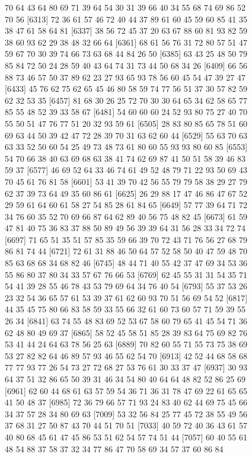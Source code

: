 \documentclass{article}
\begin{document}
\begin{figure}[H]
\begin{Schunk}
\begin{Soutput}
 [6289] 70 64 43 64 80 69 71 39 64 54 30 31 39 66 40 34 55 68 74 69 86 52 70 56
 [6313] 72 36 61 57 46 72 40 44 37 89 61 60 45 59 60 85 41 35 38 47 61 58 64 81
 [6337] 38 56 72 45 37 20 63 67 88 60 81 93 82 59 38 60 93 62 29 38 48 32 66 64
 [6361] 68 61 56 76 31 72 80 57 51 47 59 67 70 30 39 74 66 73 63 68 44 84 26 50
 [6385] 63 43 25 48 50 79 85 84 72 50 24 28 59 40 43 64 74 31 73 44 50 68 34 26
 [6409] 66 56 88 73 46 57 50 37 89 62 23 27 93 65 93 78 56 60 45 54 47 39 27 47
 [6433] 45 76 62 75 62 65 45 46 80 58 59 74 77 56 51 37 30 57 82 59 62 32 53 35
 [6457] 81 68 30 26 25 72 70 30 30 64 65 34 62 58 65 77 85 55 48 52 39 33 58 67
 [6481] 54 60 60 60 24 52 93 80 75 27 40 70 55 50 51 47 76 77 51 20 32 93 59 61
 [6505] 28 83 80 85 65 78 51 60 69 63 44 50 39 42 47 72 28 39 70 31 63 62 60 44
 [6529] 55 63 70 63 63 33 52 50 60 54 25 49 73 48 73 61 80 60 55 93 93 80 60 85
 [6553] 54 70 66 38 40 63 69 68 63 38 41 74 62 69 87 41 50 51 58 39 46 83 59 37
 [6577] 46 69 52 64 33 46 74 61 49 52 48 79 71 22 93 50 69 43 70 45 61 76 81 58
 [6601] 53 41 39 70 42 56 55 79 79 58 38 29 27 79 62 37 39 73 64 49 35 60 86 61
 [6625] 26 29 88 17 47 46 86 47 67 52 29 59 61 64 60 61 58 27 54 85 28 61 84 65
 [6649] 57 77 39 64 71 72 34 76 60 35 52 70 69 66 87 64 62 89 40 56 75 48 82 45
 [6673] 61 59 47 81 40 75 36 83 37 88 50 89 49 56 39 39 64 31 56 28 33 34 72 74
 [6697] 71 65 51 35 51 57 85 35 59 66 39 70 72 43 71 76 56 27 68 79 86 81 74 44
 [6721] 72 61 31 88 46 50 64 57 52 58 50 40 47 59 48 70 85 63 68 68 34 68 82 46
 [6745] 48 44 71 40 55 42 37 47 69 34 53 36 55 86 80 37 80 34 33 57 67 76 66 53
 [6769] 62 45 55 31 31 54 35 71 54 41 39 28 55 46 78 43 53 79 69 64 34 76 40 54
 [6793] 55 37 53 26 23 32 54 36 65 57 61 53 39 37 61 62 60 93 70 51 56 69 54 52
 [6817] 44 35 45 75 80 66 83 58 59 33 55 66 32 61 60 73 60 57 71 59 39 55 26 34
 [6841] 63 74 55 48 83 69 52 53 67 58 60 79 65 41 45 54 71 36 62 48 80 49 69 37
 [6865] 58 52 45 58 51 85 28 39 83 64 75 69 82 76 53 41 44 24 64 63 78 56 25 63
 [6889] 70 82 60 55 71 55 73 75 38 69 53 27 82 82 64 46 89 57 93 46 55 62 54 70
 [6913] 42 52 44 68 58 68 77 77 93 77 26 54 73 27 72 68 27 53 76 61 30 33 37 47
 [6937] 30 93 64 37 51 32 86 65 50 39 31 46 34 54 80 40 64 64 48 82 52 86 25 69
 [6961] 62 60 44 68 61 63 57 59 54 36 71 36 31 78 47 69 22 61 65 65 41 50 48 37
 [6985] 72 36 79 66 57 71 93 24 83 40 62 44 69 75 45 66 34 37 57 28 34 80 69 63
 [7009] 53 32 56 84 25 77 45 72 38 55 49 56 37 68 31 27 50 87 43 70 44 51 70 51
 [7033] 40 59 72 40 36 43 61 57 40 80 68 45 61 47 45 86 53 51 62 54 57 74 51 44
 [7057] 60 40 55 61 48 54 88 37 58 37 32 34 77 86 47 70 58 69 34 57 37 60 86 84

\end{Soutput}
\end{Schunk}
\end{figure}
\end{document}
